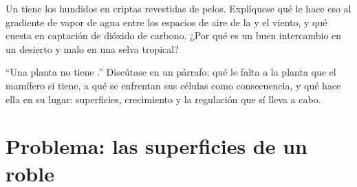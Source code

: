 \begin{exercise}[$\star\star\star$]\label{exo:b1:flowering-plant-organization:11}
Un  tiene los  hundidos en criptas revestidas de pelos.
Explíquese qué le hace eso al gradiente de vapor de agua entre los espacios
de aire de la  y el viento, y qué cuesta en captación de dióxido de
carbono. ¿Por qué es un buen intercambio en un desierto y malo en una selva
tropical?
\end{exercise}

\begin{exercise}[$\star\star\star$]\label{exo:b1:flowering-plant-organization:12}
``Una planta no tiene .'' Discútase en un párrafo: qué le falta
a la planta que el mamífero sí tiene, a qué se enfrentan sus células como
consecuencia, y qué hace ella en su lugar: superficies, crecimiento y la
regulación que sí lleva a cabo.
\end{exercise}

\section{Problema: las superficies de un roble}

